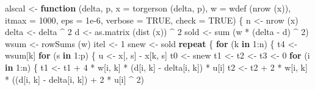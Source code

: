 \documentclass[
  12pt,
  letterpaper,
  DIV=11,
  numbers=noendperiod]{scrreprt}
\newenvironment{Shaded}{\begin{snugshade}}{\end{snugshade}}
\newcommand{\AttributeTok}[1]{\textcolor[rgb]{0.40,0.45,0.13}{#1}}
\newcommand{\ConstantTok}[1]{\textcolor[rgb]{0.56,0.35,0.01}{#1}}
\newcommand{\ControlFlowTok}[1]{\textcolor[rgb]{0.00,0.23,0.31}{\textbf{#1}}}
\newcommand{\DecValTok}[1]{\textcolor[rgb]{0.68,0.00,0.00}{#1}}
\newcommand{\FloatTok}[1]{\textcolor[rgb]{0.68,0.00,0.00}{#1}}
\newcommand{\FunctionTok}[1]{\textcolor[rgb]{0.28,0.35,0.67}{#1}}
\newcommand{\NormalTok}[1]{\textcolor[rgb]{0.00,0.23,0.31}{#1}}
\newcommand{\OtherTok}[1]{\textcolor[rgb]{0.00,0.23,0.31}{#1}}
\newcommand{\SpecialCharTok}[1]{\textcolor[rgb]{0.37,0.37,0.37}{#1}}
\theoremstyle{remark}
\begin{document}
\begin{Shaded}
\begin{Highlighting}[]
\NormalTok{alscal }\OtherTok{\textless{}{-}}
  \ControlFlowTok{function}\NormalTok{ (delta,}
\NormalTok{            p,}
            \AttributeTok{x =} \FunctionTok{torgerson}\NormalTok{ (delta, p),}
            \AttributeTok{w =} \FunctionTok{wdef}\NormalTok{ (}\FunctionTok{nrow}\NormalTok{ (x)),}
            \AttributeTok{itmax =} \DecValTok{1000}\NormalTok{,}
            \AttributeTok{eps =} \FloatTok{1e{-}6}\NormalTok{,}
            \AttributeTok{verbose =} \ConstantTok{TRUE}\NormalTok{,}
            \AttributeTok{check =} \ConstantTok{TRUE}\NormalTok{) \{}
\NormalTok{    n }\OtherTok{\textless{}{-}} \FunctionTok{nrow}\NormalTok{ (x)}
\NormalTok{    delta }\OtherTok{\textless{}{-}}\NormalTok{ delta }\SpecialCharTok{\^{}} \DecValTok{2}
\NormalTok{    d }\OtherTok{\textless{}{-}} \FunctionTok{as.matrix}\NormalTok{ (}\FunctionTok{dist}\NormalTok{ (x)) }\SpecialCharTok{\^{}} \DecValTok{2}
\NormalTok{    sold }\OtherTok{\textless{}{-}} \FunctionTok{sum}\NormalTok{ (w }\SpecialCharTok{*}\NormalTok{ (delta }\SpecialCharTok{{-}}\NormalTok{ d) }\SpecialCharTok{\^{}} \DecValTok{2}\NormalTok{)}
\NormalTok{    wsum }\OtherTok{\textless{}{-}} \FunctionTok{rowSums}\NormalTok{ (w)}
\NormalTok{    itel }\OtherTok{\textless{}{-}} \DecValTok{1}
\NormalTok{    snew }\OtherTok{\textless{}{-}}\NormalTok{ sold}
    \ControlFlowTok{repeat}\NormalTok{ \{}
      \ControlFlowTok{for}\NormalTok{ (k }\ControlFlowTok{in} \DecValTok{1}\SpecialCharTok{:}\NormalTok{n) \{}
\NormalTok{        t4 }\OtherTok{\textless{}{-}}\NormalTok{ wsum[k]}
        \ControlFlowTok{for}\NormalTok{ (s }\ControlFlowTok{in} \DecValTok{1}\SpecialCharTok{:}\NormalTok{p) \{}
\NormalTok{          u }\OtherTok{\textless{}{-}}\NormalTok{ x[, s] }\SpecialCharTok{{-}}\NormalTok{ x[k, s]}
\NormalTok{          t0 }\OtherTok{\textless{}{-}}\NormalTok{ snew}
\NormalTok{          t1 }\OtherTok{\textless{}{-}}\NormalTok{ t2 }\OtherTok{\textless{}{-}}\NormalTok{ t3 }\OtherTok{\textless{}{-}} \DecValTok{0}
          \ControlFlowTok{for}\NormalTok{ (i }\ControlFlowTok{in} \DecValTok{1}\SpecialCharTok{:}\NormalTok{n) \{}
\NormalTok{            t1 }\OtherTok{\textless{}{-}}\NormalTok{ t1 }\SpecialCharTok{+} \DecValTok{4} \SpecialCharTok{*}\NormalTok{ w[i, k] }\SpecialCharTok{*}\NormalTok{ (d[i, k] }\SpecialCharTok{{-}}\NormalTok{ delta[i, k]) }\SpecialCharTok{*}\NormalTok{ u[i]}
\NormalTok{            t2 }\OtherTok{\textless{}{-}}
\NormalTok{              t2 }\SpecialCharTok{+} \DecValTok{2} \SpecialCharTok{*}\NormalTok{ w[i, k] }\SpecialCharTok{*}\NormalTok{ ((d[i, k] }\SpecialCharTok{{-}}\NormalTok{ delta[i, k]) }\SpecialCharTok{+} \DecValTok{2} \SpecialCharTok{*}\NormalTok{ u[i] }\SpecialCharTok{\^{}} \DecValTok{2}\NormalTok{)}

\end{Highlighting}
\end{Shaded}
\end{document}

